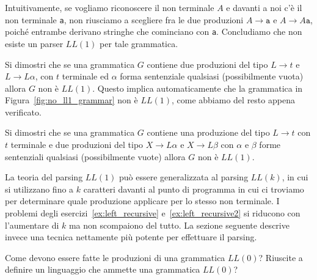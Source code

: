 %
Intuitivamente, se vogliamo riconoscere il non terminale $A$ e davanti
a noi c'\`e il non terminale \texttt{a}, non riusciamo
a scegliere fra le due produzioni $A\to\mathtt{a}$ e $A\to A\mathtt{a}$,
poich\'e entrambe derivano stringhe che cominciano con \texttt{a}.
Concludiamo che non esiste un parser $\mathit{LL}(1)$ per tale grammatica.
%
\begin{exercise}\label{ex:left_recursive}
Si dimostri che se una grammatica $G$ contiene due produzioni del tipo
$L\to t$ e $L\to L\alpha$, con $t$ terminale ed $\alpha$ forma sentenziale
qualsiasi (possibilmente vuota) allora $G$ non \`e $\mathit{LL}(1)$. Questo
implica automaticamente che la grammatica in Figura~\ref{fig:no_ll1_grammar}
non \`e $\mathit{LL}(1)$, come abbiamo del resto appena verificato.
\end{exercise}
%
\begin{exercise}\label{ex:left_recursive2}
Si dimostri che se una grammatica $G$ contiene una produzione del tipo
$L\to t$ con $t$ terminale e due produzioni del tipo $X\to L\alpha$ e
$X\to L\beta$ con $\alpha$ e $\beta$ forme sentenziali qualsiasi
(possibilmente vuote) allora $G$ non \`e $\mathit{LL}(1)$.
\end{exercise}
%

La teoria del parsing $\mathit{LL}(1)$ pu\`o essere generalizzata al parsing
$\mathit{LL}(k)$, in cui si utilizzano fino a $k$ caratteri davanti al punto
di programma in cui ci troviamo per determinare quale produzione applicare
per lo stesso non terminale. I problemi degli
esercizi~\ref{ex:left_recursive} e~\ref{ex:left_recursive2} si riducono
con l'aumentare di $k$
ma non scompaiono del tutto. La sezione seguente descrive invece una
tecnica nettamente pi\`u potente per effettuare il parsing.
%
\begin{exercise}\label{ex:ll0}
Come devono essere fatte le produzioni di una grammatica $\mathit{LL}(0)$?
Riuscite a definire un linguaggio che ammette una grammatica $\mathit{LL}(0)$?
\end{exercise}
%
